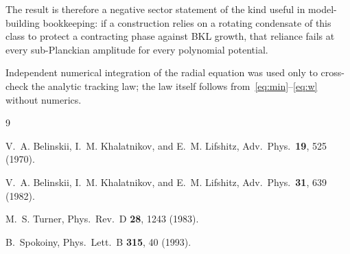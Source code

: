 \documentclass[aps,prd,twocolumn,superscriptaddress,nofootinbib,10pt]{revtex4-2}
\begin{document}
The result is therefore a negative sector statement of the kind useful in model-building
bookkeeping: if a construction relies on a rotating condensate of this class to protect a
contracting phase against BKL growth, that reliance fails at every sub-Planckian amplitude for
every polynomial potential.

\begin{acknowledgments}
Independent numerical integration of the radial equation was used only to cross-check the analytic
tracking law; the law itself follows from~\eqref{eq:min}--\eqref{eq:w} without numerics.
\end{acknowledgments}

\begin{thebibliography}{9}

V.~A. Belinskii, I.~M. Khalatnikov, and E.~M. Lifshitz,
Adv.\ Phys.\ \textbf{19}, 525 (1970).

V.~A. Belinskii, I.~M. Khalatnikov, and E.~M. Lifshitz,
Adv.\ Phys.\ \textbf{31}, 639 (1982).

M.~S. Turner,
Phys.\ Rev.\ D \textbf{28}, 1243 (1983).

B.~Spokoiny,
Phys.\ Lett.\ B \textbf{315}, 40 (1993).

\end{thebibliography}
\end{document}
